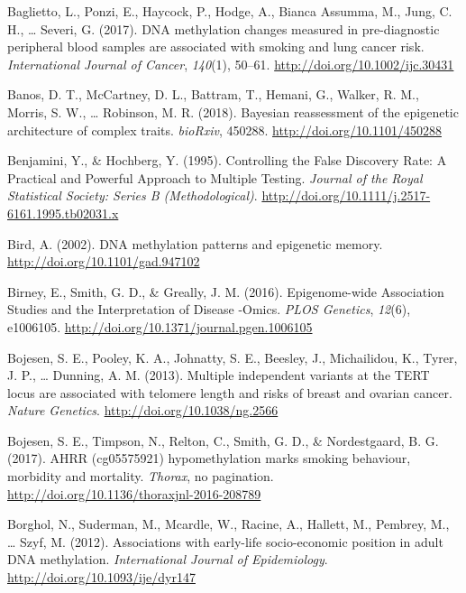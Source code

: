 \documentclass[11pt,twoside]{bristolthesis}
\newlength{\cslhangindent}
\newenvironment{cslreferences}%
  {\setlength{\parindent}{0pt}%
  \everypar{\setlength{\hangindent}{\cslhangindent}}\ignorespaces}%
  {\par}
\begin{document}
\hypertarget{refs}{}
\begin{cslreferences}
\leavevmode\hypertarget{ref-Baglietto2017}{}%
Baglietto, L., Ponzi, E., Haycock, P., Hodge, A., Bianca Assumma, M., Jung, C. H., \ldots{} Severi, G. (2017). DNA methylation changes measured in pre-diagnostic peripheral blood samples are associated with smoking and lung cancer risk. \emph{International Journal of Cancer}, \emph{140}(1), 50--61. \url{http://doi.org/10.1002/ijc.30431}

\leavevmode\hypertarget{ref-Banos2018}{}%
Banos, D. T., McCartney, D. L., Battram, T., Hemani, G., Walker, R. M., Morris, S. W., \ldots{} Robinson, M. R. (2018). Bayesian reassessment of the epigenetic architecture of complex traits. \emph{bioRxiv}, 450288. \url{http://doi.org/10.1101/450288}

\leavevmode\hypertarget{ref-Benjamini1995}{}%
Benjamini, Y., \& Hochberg, Y. (1995). Controlling the False Discovery Rate: A Practical and Powerful Approach to Multiple Testing. \emph{Journal of the Royal Statistical Society: Series B (Methodological)}. \url{http://doi.org/10.1111/j.2517-6161.1995.tb02031.x}

\leavevmode\hypertarget{ref-Bird2002}{}%
Bird, A. (2002). DNA methylation patterns and epigenetic memory. \url{http://doi.org/10.1101/gad.947102}

\leavevmode\hypertarget{ref-Birney2016}{}%
Birney, E., Smith, G. D., \& Greally, J. M. (2016). Epigenome-wide Association Studies and the Interpretation of Disease -Omics. \emph{PLOS Genetics}, \emph{12}(6), e1006105. \url{http://doi.org/10.1371/journal.pgen.1006105}

\leavevmode\hypertarget{ref-Bojesen2013}{}%
Bojesen, S. E., Pooley, K. A., Johnatty, S. E., Beesley, J., Michailidou, K., Tyrer, J. P., \ldots{} Dunning, A. M. (2013). Multiple independent variants at the TERT locus are associated with telomere length and risks of breast and ovarian cancer. \emph{Nature Genetics}. \url{http://doi.org/10.1038/ng.2566}

\leavevmode\hypertarget{ref-Bojesen2017}{}%
Bojesen, S. E., Timpson, N., Relton, C., Smith, G. D., \& Nordestgaard, B. G. (2017). AHRR (cg05575921) hypomethylation marks smoking behaviour, morbidity and mortality. \emph{Thorax}, no pagination. \url{http://doi.org/10.1136/thoraxjnl-2016-208789}

\leavevmode\hypertarget{ref-Borghol2012}{}%
Borghol, N., Suderman, M., Mcardle, W., Racine, A., Hallett, M., Pembrey, M., \ldots{} Szyf, M. (2012). Associations with early-life socio-economic position in adult DNA methylation. \emph{International Journal of Epidemiology}. \url{http://doi.org/10.1093/ije/dyr147}


\end{cslreferences}
\end{document}
